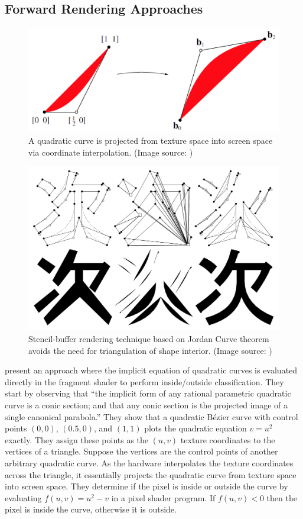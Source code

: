 \documentclass[11pt,a4paper,twoside]{article}
\begin{document}
\subsection {Forward Rendering Approaches}

\begin {figure} [t]
	\centering
	\includegraphics [width=0.45\columnwidth] {figures/loop_blinn}
	\caption {A quadratic curve is projected from texture space into screen space via coordinate interpolation. (Image source: \cite{LoopBlinn05}) }
	\label {fig:loop_blinn}
\end {figure}

\begin {figure} [t]
	\centering
	\includegraphics [width=0.45\columnwidth] {figures/kokojima}
	\caption {Stencil-buffer rendering technique based on Jordan Curve theorem avoids the need for triangulation of shape interior. (Image source: \cite{Kokojima06}) }
	\label {fig:kokojima}
\end {figure}


\cite{LoopBlinn05} present an approach where the implicit equation of quadratic curves is evaluated directly in the fragment shader to perform inside/outside classification. They start by observing that ``the implicit form of any rational parametric quadratic curve is a conic section; and that any conic section is the projected image of a single canonical parabola.'' They show that a quadratic B\'{e}zier curve with control points $(0,0)$, $(0.5,0)$, and $(1,1)$ plots the quadratic equation $v = u^2$ exactly. They assign these points as the $(u,v)$ texture coordinates to the vertices of a triangle. Suppose the vertices are the control points of another arbitrary quadratic curve. As the hardware interpolates the texture coordinates across the triangle, it essentially projects the quadratic curve from texture space into screen space. They determine if the pixel is inside or outside the curve by evaluating $f(u,v) = u^2 - v$ in a pixel shader program. If $f(u,v) < 0$ then the pixel is inside the curve, otherwise it is outside.
\end{document}
